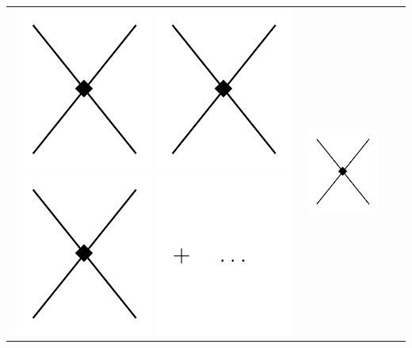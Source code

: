 \begin{table}
\begin{tabular}{ c | c | c | c }
{\includegraphics[scale=0.55,page=2]{Introduction/Figures/N3LO}
\includegraphics[scale=0.55,page=3]{Introduction/Figures/N3LO}
\includegraphics[scale=0.55,page=4]{Introduction/Figures/N3LO}
\includegraphics[scale=0.55,page=1]{Introduction/Figures/ellipsis} 
}  &  
\parbox[c][][c]{5.8cm}{\centering
\includegraphics[scale=0.55,page=5]{Introduction/Figures/N3LO}
}
\end{tabular}
\end{table}
